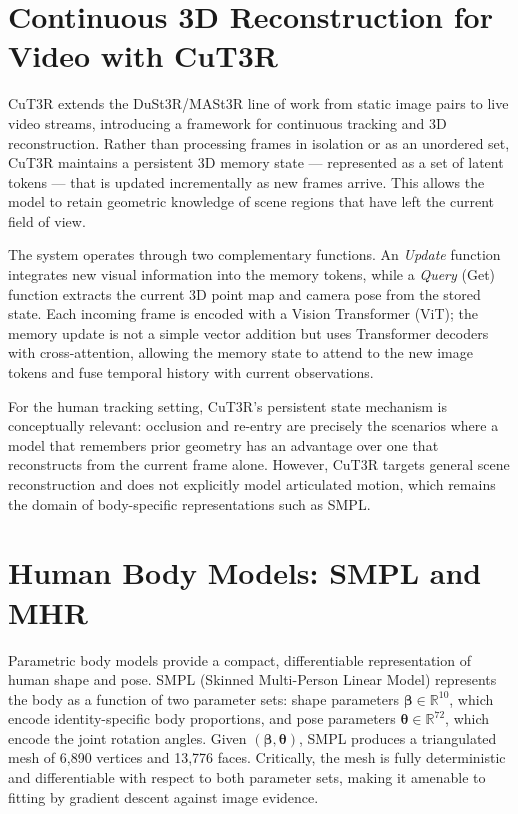 \documentclass[12pt, a4paper, oneside]{report}
\begin{document}
\section{Continuous 3D Reconstruction for Video with CuT3R}
CuT3R \cite{wang2025continuous3dperceptionmodel} extends the DuSt3R/MASt3R line of work from static image pairs to live video streams, introducing a framework for continuous tracking and 3D reconstruction. Rather than processing frames in isolation or as an unordered set, CuT3R maintains a persistent 3D memory state --- represented as a set of latent tokens --- that is updated incrementally as new frames arrive. This allows the model to retain geometric knowledge of scene regions that have left the current field of view.

The system operates through two complementary functions. An \textit{Update} function integrates new visual information into the memory tokens, while a \textit{Query} (Get) function extracts the current 3D point map and camera pose from the stored state. Each incoming frame is encoded with a Vision Transformer (ViT); the memory update is not a simple vector addition but uses Transformer decoders with cross-attention, allowing the memory state to attend to the new image tokens and fuse temporal history with current observations.

For the human tracking setting, CuT3R's persistent state mechanism is conceptually relevant: occlusion and re-entry are precisely the scenarios where a model that remembers prior geometry has an advantage over one that reconstructs from the current frame alone. However, CuT3R targets general scene reconstruction and does not explicitly model articulated motion, which remains the domain of body-specific representations such as SMPL.

\section{Human Body Models: SMPL and MHR}
\label{sec:smpl}
Parametric body models provide a compact, differentiable representation of human shape and pose. SMPL \cite{loper2015smpl} (Skinned Multi-Person Linear Model) represents the body as a function of two parameter sets: shape parameters $\boldsymbol{\beta} \in \mathbb{R}^{10}$, which encode identity-specific body proportions, and pose parameters $\boldsymbol{\theta} \in \mathbb{R}^{72}$, which encode the joint rotation angles. Given $(\boldsymbol{\beta}, \boldsymbol{\theta})$, SMPL produces a triangulated mesh of 6,890 vertices and 13,776 faces. Critically, the mesh is fully deterministic and differentiable with respect to both parameter sets, making it amenable to fitting by gradient descent against image evidence.
\end{document}
